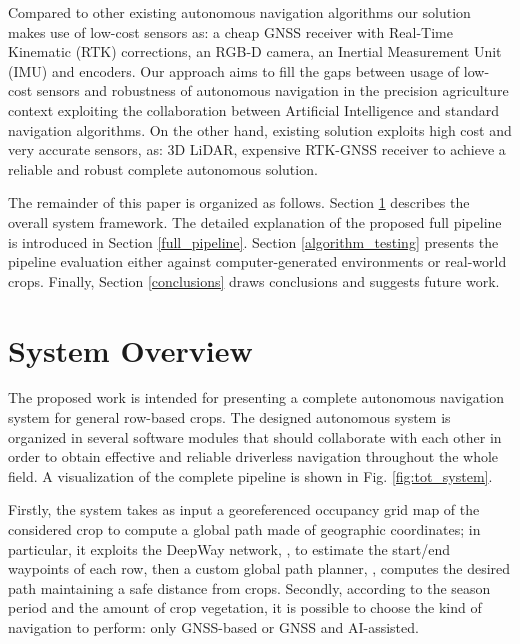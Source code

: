 \documentclass[journal]{IEEEtran}
\begin{document}
Compared to other existing autonomous navigation algorithms our solution makes use of low-cost sensors as: a cheap GNSS receiver with Real-Time Kinematic (RTK) corrections, an RGB-D camera, an Inertial Measurement Unit (IMU) and encoders. Our approach aims to fill the gaps between usage of low-cost sensors and robustness of autonomous navigation in the precision agriculture context exploiting the collaboration between Artificial Intelligence and standard navigation algorithms. On the other hand, existing solution exploits high cost and very accurate sensors, as: 3D LiDAR, expensive RTK-GNSS receiver to achieve a reliable and robust complete autonomous solution.

The remainder of this paper is organized as follows. Section \ref{system_overview} describes the overall system framework. The detailed explanation of the proposed full pipeline is introduced in Section \ref{full_pipeline}. Section \ref{algorithm_testing} presents the pipeline evaluation either against computer-generated environments or real-world crops. Finally, Section \ref{conclusions} draws conclusions and suggests future work.

\section{System Overview}

\label{system_overview}
The proposed work is intended for presenting a complete autonomous navigation system for general row-based crops. The designed autonomous system is organized in several software modules that should collaborate with each other in order to obtain effective and reliable driverless navigation throughout the whole field. A visualization of the complete pipeline is shown in Fig. \ref{fig:tot_system}.

Firstly, the system takes as input a georeferenced occupancy grid map of the considered crop to compute a global path made of geographic coordinates; in particular, it exploits the DeepWay network, \cite{mazzia2021deepway},  to estimate the start/end waypoints of each row, then a custom global path planner, \cite{cerrato2021adaptive}, computes the desired path maintaining a safe distance from crops. Secondly, according to the season period and the amount of crop vegetation, it is possible to choose the kind of navigation to perform: only GNSS-based or GNSS and AI-assisted. 
\end{document}
